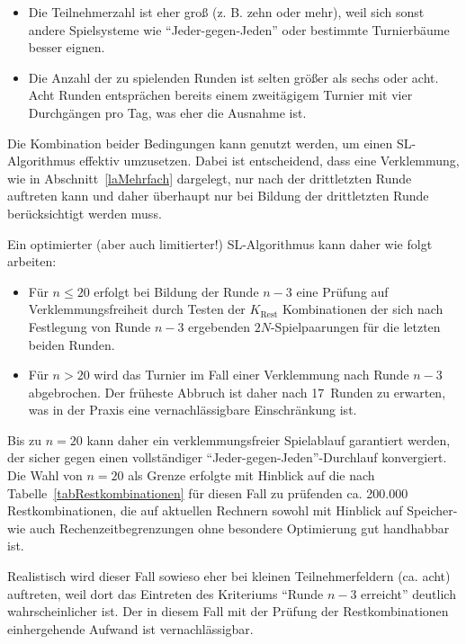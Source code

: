\documentclass[DIV=15, 10pt]{scrartcl}
\begin{document}
\begin{itemize}

\item Die Teilnehmerzahl ist eher groß (z. B. zehn oder mehr), weil sich sonst andere Spielsysteme wie "`Jeder-gegen-Jeden"' oder bestimmte Turnierbäume besser eignen.

\item Die Anzahl der zu spielenden Runden ist selten größer als sechs oder acht. Acht Runden entsprächen bereits einem zweitägigem Turnier mit vier Durchgängen pro Tag, was eher die Ausnahme ist.

\end{itemize}

Die Kombination beider Bedingungen kann genutzt werden, um einen SL-Algorithmus effektiv umzusetzen. Dabei ist entscheidend, dass eine Verklemmung, wie in Abschnitt~\ref{laMehrfach} dargelegt, nur nach der drittletzten Runde auftreten kann und daher überhaupt nur bei Bildung der drittletzten Runde berücksichtigt werden muss.

Ein optimierter (aber auch limitierter!) SL-Algorithmus kann daher wie folgt arbeiten:

\begin{itemize}

\item Für $n \leq 20$ erfolgt bei Bildung der Runde $n-3$ eine Prüfung auf Verklemmungsfreiheit durch Testen der $K_\text{Rest}$ Kombinationen der sich nach Festlegung von Runde $n-3$ ergebenden $2N$-Spielpaarungen für die letzten beiden Runden.

\item Für $n > 20$ wird das Turnier im Fall einer Verklemmung nach Runde $n-3$ abgebrochen. Der früheste Abbruch ist daher nach 17~Runden zu erwarten, was in der Praxis eine vernachlässigbare Einschränkung ist.

\end{itemize}

Bis zu $n=20$ kann daher ein verklemmungsfreier Spielablauf garantiert werden, der sicher gegen einen vollständiger "`Jeder-gegen-Jeden"'-Durchlauf konvergiert. Die Wahl von $n=20$ als Grenze erfolgte mit Hinblick auf die nach Tabelle~\ref{tabRestkombinationen} für diesen Fall zu prüfenden ca. 200.000 Restkombinationen, die auf aktuellen Rechnern sowohl mit Hinblick auf Speicher- wie auch Rechenzeitbegrenzungen ohne besondere Optimierung gut handhabbar ist.

Realistisch wird dieser Fall sowieso eher bei kleinen Teilnehmerfeldern (ca. acht) auftreten, weil dort das Eintreten des Kriteriums "`Runde $n-3$ erreicht"' deutlich wahrscheinlicher ist. Der in diesem Fall mit der Prüfung der Restkombinationen einhergehende Aufwand ist vernachlässigbar.
\end{document}
